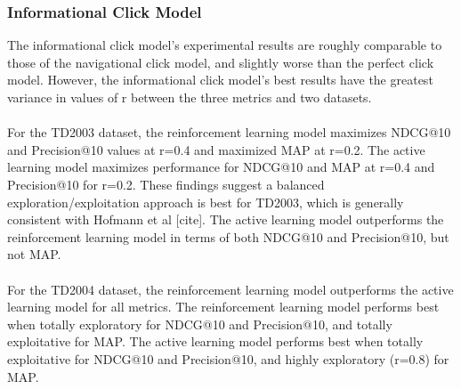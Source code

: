 \documentclass{acm_proc_article-sp}
\begin{document}
\subsubsection{Informational Click Model}
The informational click model’s experimental results are roughly comparable to those of the navigational click model, and slightly worse than the perfect click model.  However, the informational click model’s best results have the greatest variance in values of r between the three metrics and two datasets.   \\ \\
For the TD2003 dataset, the reinforcement learning model maximizes NDCG@10 and Precision@10 values at r=0.4 and maximized MAP at r=0.2.  The active learning model maximizes performance for NDCG@10 and MAP at r=0.4 and Precision@10 for r=0.2.  These findings suggest a balanced exploration/exploitation approach is best for TD2003, which is generally consistent with Hofmann et al [cite].  The active learning model outperforms the reinforcement learning model in terms of both NDCG@10 and Precision@10, but not MAP. \\ \\
For the TD2004 dataset, the reinforcement learning model outperforms the active learning model for all metrics.  The reinforcement learning model performs best when totally exploratory for NDCG@10 and Precision@10, and totally exploitative for MAP.  The active learning model performs best when totally exploitative for NDCG@10 and Precision@10, and highly exploratory (r=0.8) for MAP.  
\end{document}

